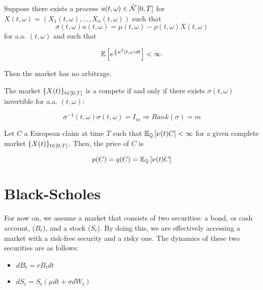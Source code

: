 \documentclass[../TGMAFFIRO.tex]{subfiles}
\begin{document}
\begin{theorem}\label{th:arbitrage_free_market}
	Suppose there exists a process $u(t,\omega) \in \hat{\mathcal{N}}\left[0, T\right]$ for $X(t,\omega) = (X_1(t,\omega), \ldots, X_n(t,\omega))$ such that
	\begin{equation}
		\sigma(t,\omega) u(t,\omega) = \mu(t, \omega) - \rho(t,\omega) X(t,\omega)
	\end{equation}
	for a.a. $(t,\omega)$ and such that
	
	\begin{equation}\label{eq:condition_arbitrage_free_market}
		\mathbb{E}\left[e^{\frac{1}{2}u^2(t,\omega) dt}\right] < \infty.
	\end{equation}
	
	Then the market has no arbitrage.
\end{theorem}

\begin{theorem}\label{th:complete_market}
	The market $\{X(t)\}_{t\in[0,T]}$ is a compete if and only if there exists $\sigma(t,\omega)$ invertible for a.a. $(t,\omega)$:
		
	\begin{equation}
		\sigma^{-1}(t,\omega) \sigma(t,\omega) = I_m \Rightarrow Rank(\sigma) = m
	\end{equation}
\end{theorem}

\begin{theorem}
	Let $C$ a European claim at time $T$ such that $\mathbb{E}_{\mathbb{Q}}\left[\nu(t)C\right] < \infty$ for a given complete market $\{X(t)\}_{t\in[0,T]}$. Then, the price of $C$ is
	
	\begin{equation}
		p(C) = q(C) = \mathbb{E}_{\mathbb{Q}}\left[\nu(t)C\right]
	\end{equation}

\end{theorem}

\section{Black-Scholes}
For now on, we assume a market that consists of two securities: a bond, or cash account, ($B_t$), and a stock ($S_t$). By doing this, we are effectively accessing a market with a risk-free security and a risky one. The dynamics of these two securities are as follows:
\begin{itemize}
	\item $dB_t = r B_t dt$
	\item $dS_t = S_t(\mu dt + \sigma dW_t)$
\end{itemize}
\end{document}
